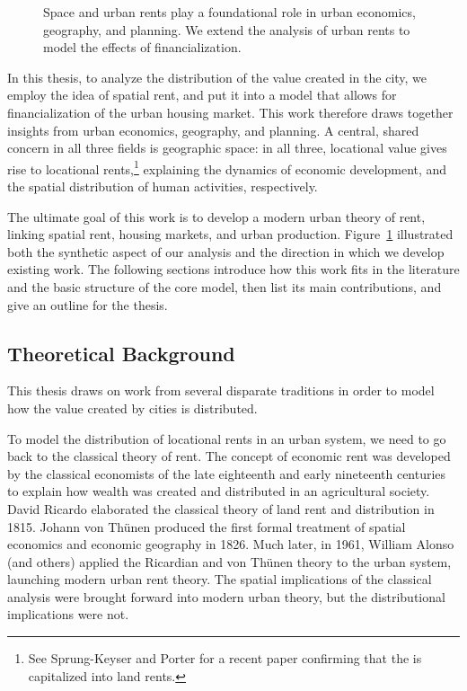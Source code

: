 \begin{figure}[!ht]
\centering

\caption[Linking space and urban rents to the effects of financialization.]{Space and urban rents play a foundational role in urban economics, geography, and planning. We extend the analysis of urban rents to model the effects of financialization.}
\label{fig-fields}
\end{figure}
In this thesis, to analyze the distribution of the value created in the city, we employ the idea of spatial rent, and put it into a model that allows for financialization of the urban housing market. This work therefore draws together insights from urban economics, geography, and planning. A central, shared concern in all three fields is geographic space: in all three, locational value gives rise to locational rents,\footnote{See Sprung-Keyser and Porter \cite{medina-olivaresJointModelLongitudinal2023} for a recent paper confirming that the is capitalized into land rents.}  explaining the dynamics of economic development, and the spatial distribution of human activities, respectively. 

The ultimate goal of this work is to develop a modern urban theory of rent, linking spatial rent, housing markets, and urban production. 
Figure~\ref{fig-fields} illustrated both the synthetic aspect of our analysis and the direction in which we develop existing work. The following sections introduce how this work fits in the literature and the basic structure of the core model, then list its main contributions, and give an outline for the thesis.

\subsection{Theoretical Background}

This thesis draws on work from several disparate traditions in order to model how the value created by cities is distributed.

To model the distribution of locational rents in an urban system, we need to go back to the classical theory of rent. The concept of economic rent was developed by the classical economists of the late eighteenth and early nineteenth centuries to explain how wealth was created and distributed in an agricultural society. David Ricardo \cite{ricardoEssayInfluenceLow1815} elaborated the classical theory of land rent and distribution in 1815.
Johann von Th\"unen \cite{vonthunenIsolirteStaatBeziehung1826} produced the first formal treatment of spatial economics and economic geography in 1826. Much later, in 1961, William Alonso (and others) \cite{alonsoModelUrbanLand1960} applied the Ricardian and von Th\"unen theory to the urban system, launching modern urban rent theory.  The spatial implications of the classical analysis were brought forward into modern urban theory, but the distributional implications were not. 

